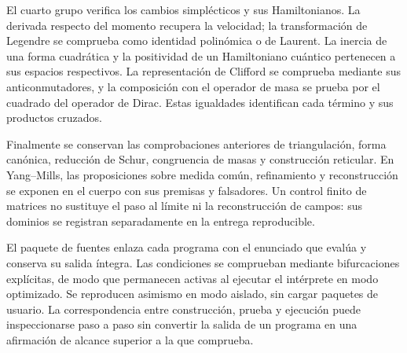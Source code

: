 El cuarto grupo verifica los cambios simplécticos y sus
Hamiltonianos. La derivada respecto del momento recupera la
velocidad; la transformación de Legendre se comprueba como
identidad polinómica o de Laurent. La inercia de una forma
cuadrática y la positividad de un Hamiltoniano cuántico
pertenecen a sus espacios respectivos. La representación
de Clifford se comprueba mediante sus anticonmutadores,
y la composición con el operador de masa se prueba por
el cuadrado del operador de Dirac. Estas igualdades
identifican cada término y sus productos cruzados.

Finalmente se conservan las comprobaciones anteriores de
triangulación, forma canónica, reducción de Schur, congruencia
de masas y construcción reticular. En Yang--Mills, las
proposiciones sobre medida común, refinamiento y reconstrucción
se exponen en el cuerpo con sus premisas y falsadores. Un
control finito de matrices no sustituye el paso al límite
ni la reconstrucción de campos: sus dominios se registran
separadamente en la entrega reproducible.

El paquete de fuentes enlaza cada programa con el enunciado
que evalúa y conserva su salida íntegra. Las condiciones se
comprueban mediante bifurcaciones explícitas, de modo que
permanecen activas al ejecutar el intérprete en modo
optimizado. Se reproducen asimismo en modo aislado, sin
cargar paquetes de usuario. La correspondencia entre
construcción, prueba y ejecución puede inspeccionarse
paso a paso sin convertir la salida de un programa en
una afirmación de alcance superior a la que comprueba.
